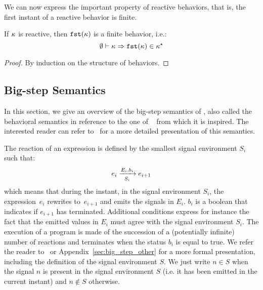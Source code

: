 \documentclass[9pt,preprint]{sigplanconf}
\begin{document}
We can now express the important property of reactive behaviors, that is, the first instant of a reactive behavior is finite.
\begin{property}
If $\rk$ is  reactive, then $\rkfst{\rk}$ is a finite behavior, i.e.:
\[ \wf{\emptyset}{\rk} \Rightarrow \rkfinite{\rkfst{\rk}} \]
\end{property}
\begin{proof}
By induction on the structure of behaviors.
\end{proof}

\subsection{Big-step Semantics}
\label{sec:semantics}

In this section, we give an overview of the big-step semantics of \rml{}, also called the behavioral semantics in reference to the one of \esterel~\cite{Berry:1996} from which it is inspired. The interested reader can refer to~\cite{Mandel:2005} for a more detailed presentation of this semantics.

The reaction of an expression is defined by the smallest signal environment $S_i$ such that:
\[ \bigstep{N}{e_i}{e_{i+1}}{E_i}{b_i}{S_i} \]
which means that during the instant, in the signal environment $S_i$, the expression~$e_i$ rewrites to~$e_{i+1}$ and emits the signals in $E_i$. $b_i$ is a boolean that indicates if $e_{i+1}$ has terminated. Additional conditions express for instance the fact that the emitted values in $E_i$ must agree with the signal environment $S_i$. The execution of a program is made of the succession of a (potentially infinite) number of reactions and terminates when the status $b_i$ is equal to true.
%
 We refer the reader to~\cite{Mandel:2005} or Appendix~\ref{sec:big_step_other} for a more formal presentation, including the definition of the signal environment $S$. We just write $n \in S$ when the signal $n$ is present in the signal environment $S$ (i.e. it has been emitted in the current instant) and $n \not\in S$ otherwise.
\end{document}
